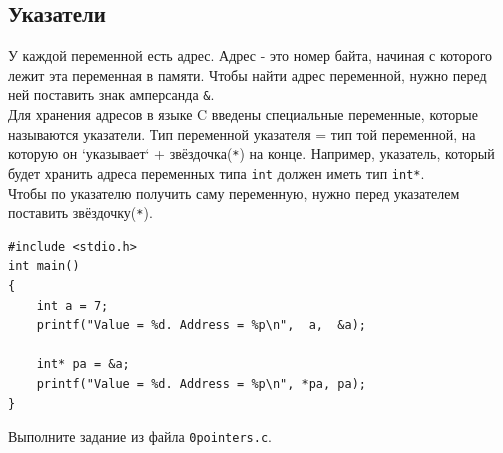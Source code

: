\documentclass{article}
\begin{document}
\newpage

\subsection*{Указатели}
У каждой переменной есть адрес. Адрес - это номер байта, начиная с которого лежит эта переменная в памяти. Чтобы найти адрес переменной, нужно перед ней поставить знак амперсанда \texttt{\&}. \\
Для хранения адресов в языке C введены специальные переменные, которые называются указатели. Тип переменной указателя = тип той переменной, на которую он `указывает` + звёздочка(\texttt{*}) на конце. Например, указатель, который будет хранить адреса переменных типа \texttt{int} должен иметь тип \texttt{int*}. \\
Чтобы по указателю получить саму переменную, нужно перед указателем поставить звёздочку(\texttt{*}).
\begin{lstlisting}
#include <stdio.h>
int main()
{
    int a = 7;
    printf("Value = %d. Address = %p\n",  a,  &a);
    
    int* pa = &a;
    printf("Value = %d. Address = %p\n", *pa, pa);
}
\end{lstlisting}
Выполните задание из файла \texttt{0pointers.c}.
\end{document}
